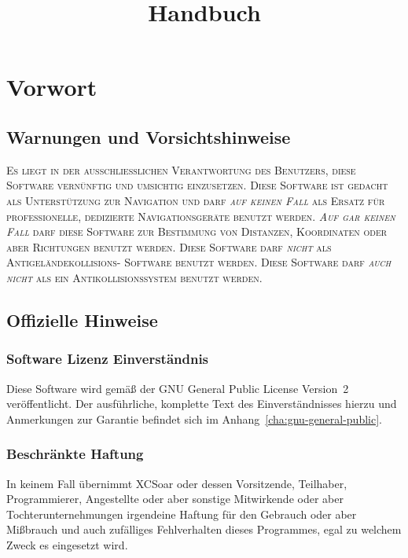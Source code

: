 \documentclass[german,a4paper,11pt]{refrep}
\title{Handbuch}%
\begin{document}
\sloppy%
%
\maketitle
\begingroup\setlength{\parskip}{0.1\baselineskip}\tableofcontents\endgroup
\chapter*{Vorwort}
\section*{Warnungen und Vorsichtshinweise}
%
\warning
\textsc{Es liegt in der ausschließlichen Verantwortung des Benutzers, diese Software vernünftig
und umsichtig einzusetzen. Diese Software ist gedacht als Unterstützung zur Navigation
und darf \emph{auf keinen Fall} als Ersatz für professionelle, dedizierte Navigationsgeräte benutzt
werden. \emph{Auf gar keinen Fall} darf diese Software zur Bestimmung von Distanzen, Koordinaten
oder aber Richtungen benutzt werden. Diese Software darf \emph{nicht} als Antigeländekollisions- Software benutzt werden.
Diese Software darf \emph{auch nicht} als ein Antikollisionssystem benutzt werden.}
%
\section*{Offizielle Hinweise}
\subsection*{Software Lizenz Einverständnis}
%
Diese Software wird gemäß der GNU General Public License Version~2 veröffentlicht. Der ausführliche,
komplette Text des Einverständnisses hierzu und Anmerkungen zur Garantie befindet sich
im Anhang~\ref{cha:gnu-general-public}.
%
\subsection*{Beschränkte Haftung}
In keinem Fall übernimmt XCSoar oder dessen Vorsitzende, Teilhaber, Programmierer, Angestellte  oder aber sonstige Mitwirkende  oder aber  Tochterunternehmungen irgendeine Haftung für den Gebrauch oder aber Mißbrauch und auch zufälliges Fehlverhalten dieses Programmes, egal zu welchem Zweck es eingesetzt wird.
%
\end{document}
